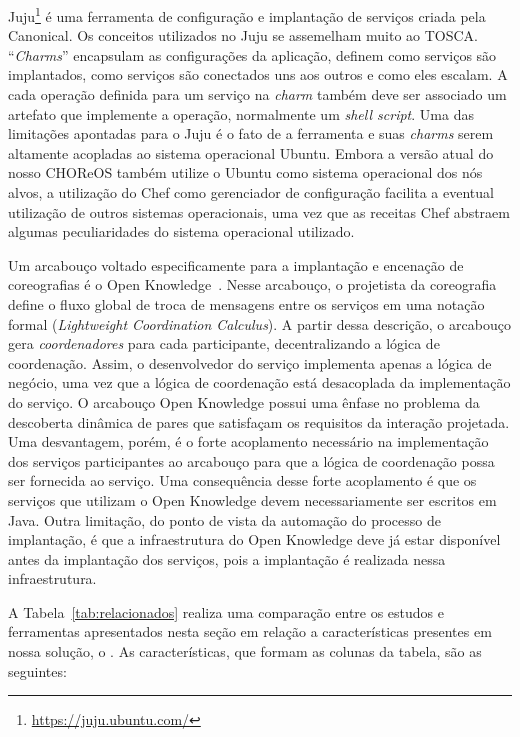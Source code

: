 Juju\footnote{\url{https://juju.ubuntu.com/}} é uma ferramenta 
de configuração e implantação de serviços criada pela Canonical.
Os conceitos utilizados no Juju se assemelham muito ao TOSCA.
``\emph{Charms}'' encapsulam as configurações da aplicação,
definem como serviços são implantados, como serviços
são conectados uns aos outros e como eles escalam.
A cada operação definida para um serviço na \emph{charm}
também deve ser associado um artefato que implemente a operação,
normalmente um \emph{shell script}.
Uma das limitações apontadas para o Juju é o fato
de a ferramenta e suas \emph{charms} serem altamente acopladas ao
sistema operacional Ubuntu.
Embora a versão atual do nosso CHOReOS \ee também utilize o Ubuntu
como sistema operacional dos nós alvos,
a utilização do Chef como gerenciador de configuração
facilita a eventual utilização de outros sistemas operacionais,
uma vez que as receitas Chef abstraem algumas peculiaridades
do sistema operacional utilizado.

Um arcabouço voltado especificamente para a implantação e encenação
de coreografias é o Open Knowledge~\cite{Besana2008OpenKnowledge,Siebes2007OK}.
Nesse arcabouço, o projetista da coreografia define o fluxo global
de troca de mensagens entre os serviços em uma notação formal
(\emph{Lightweight Coordination Calculus}).
A partir dessa descrição, o arcabouço gera \emph{coordenadores}
para cada participante, decentralizando a lógica de coordenação.
Assim, o desenvolvedor do serviço implementa apenas a lógica de negócio,
uma vez que a lógica de coordenação está desacoplada da implementação do serviço.
O arcabouço Open Knowledge possui uma ênfase no problema
da descoberta dinâmica de pares que satisfaçam os requisitos
da interação projetada. Uma desvantagem, porém,
é o forte acoplamento necessário na implementação dos serviços participantes
ao arcabouço para que a lógica de coordenação possa ser fornecida ao serviço.
Uma consequência desse forte acoplamento é que os serviços que
utilizam o Open Knowledge devem necessariamente ser escritos em Java.
Outra limitação, do ponto de vista da automação do processo de implantação,
é que a infraestrutura do Open Knowledge deve já estar disponível
antes da implantação dos serviços, pois a implantação é realizada nessa infraestrutura.

A Tabela~\ref{tab:relacionados} realiza uma comparação entre os estudos e ferramentas apresentados nesta seção em relação a características presentes em nossa solução, o \ee. 
As características, que formam as colunas da tabela, são as seguintes:

